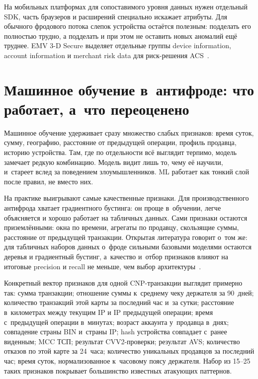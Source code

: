 На мобильных платформах для сопоставимого уровня данных нужен
отдельный SDK, часть браузеров и расширений специально искажает
атрибуты. Для обычного фродового потока слепок устройства остаётся
полезным: подделать его полностью трудно, а подделать и при этом не
оставить новых аномалий ещё труднее. EMV 3-D Secure выделяет отдельные
группы device information, account information и merchant risk data
для риск-решения ACS~\cite{emvco-3ds-tech-features}.

\section{Машинное обучение в~антифроде: что работает, а~что переоценено}\label{sec:fraud-ml}

Машинное обучение удерживает сразу множество слабых признаков: время
суток, сумму, географию, расстояние от предыдущей операции, профиль
продавца, историю устройства. Там, где по отдельности всё выглядит
терпимо, модель замечает редкую комбинацию. Модель видит лишь то,
чему её научили, и~стареет вслед за поведением злоумышленников. ML
работает как тонкий слой после правил, не вместо них.

На практике выигрывают самые качественные признаки. Для
производственного антифрода хватает градиентного бустинга: он проще
в~обучении, легче объясняется и хорошо работает на табличных данных.
Сами признаки остаются приземлёнными: окна по времени, агрегаты по
продавцу, скользящие суммы, расстояние от предыдущей транзакции.
Открытая литература говорит о~том же: для табличных наборов данных
о~фроде сильными базовыми моделями остаются деревья и градиентный
бустинг, а~качество и~отбор признаков влияют на итоговые precision
и recall не меньше, чем выбор
архитектуры~\cite{fraud-feature-selection-2024,fraud-lightgbm-2024}.

Конкретный вектор признаков для одной CNP-транзакции выглядит
примерно так: сумма транзакции; отношение суммы к~среднему чеку
держателя за 90~дней; количество транзакций этой карты за последний
час и~за сутки; расстояние в~километрах между текущим IP
и IP предыдущей операции; время с~предыдущей операции
в~минутах; возраст аккаунта у~продавца в~днях; совпадение
страны BIN и~страны IP; hash устройства совпадает с~ранее
виденным; MCC ТСП; результат CVV2-проверки; результат
AVS; количество отказов по этой карте за 24~часа; количество уникальных
продавцов за последний час; время суток, нормализованное
к~часовому поясу держателя. Набор из 15--25 таких признаков
покрывает большинство известных атакующих паттернов.

